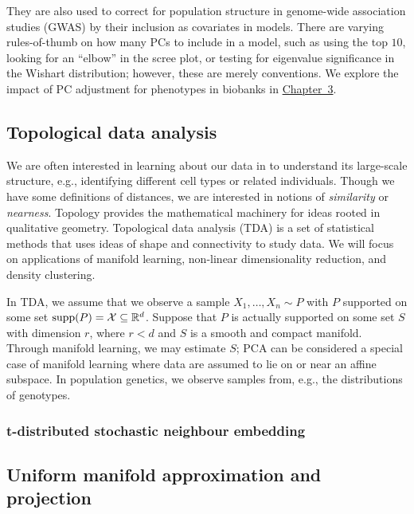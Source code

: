 They are also used to correct for population structure in genome-wide association studies (GWAS) by their inclusion as covariates in models\cite{price_principal_2006}. There are varying rules-of-thumb on how many PCs to include in a model, such as using the top $10$, looking for an ``elbow'' in the scree plot, or testing for eigenvalue significance in the Wishart distribution; however, these are merely conventions. We explore the impact of PC adjustment for phenotypes in biobanks in \hyperref[chap:chapter3]{Chapter~3}. 

\subsection{Topological data analysis}

We are often interested in learning about our data in to understand its large-scale structure, e.g., identifying different cell types or related individuals. Though we have some definitions of distances, we are interested in notions of \textit{similarity} or \textit{nearness}. Topology provides the mathematical machinery for ideas rooted in qualitative geometry\citep{carlsson_topology_2009}. Topological data analysis (TDA) is a set of statistical methods that uses ideas of shape and connectivity to study data\citep{wasserman_topological_2018}. We will focus on applications of manifold learning, non-linear dimensionality reduction, and density clustering.

In TDA, we assume that we observe a sample $X_1, \dots, X_n \sim P$ with $P$ supported on some set $\operatorname{supp}(P) = \mathcal{X} \subseteq \mathbb{R}^d$. Suppose that $P$ is actually supported on some set $S$ with dimension $r$, where $r < d$ and $S$ is a smooth and compact manifold. Through manifold learning, we may estimate $S$; PCA can be considered a special case of manifold learning where data are assumed to lie on or near an affine subspace\citep{wasserman_topological_2018}. In population genetics, we observe samples from, e.g., the distributions of genotypes.

\subsubsection{t-distributed stochastic neighbour embedding}



\citep{maaten_visualizing_2008}

\subsection{Uniform manifold approximation and projection}

